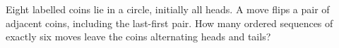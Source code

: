 Eight labelled coins lie in a circle, initially all heads. A move flips a pair of adjacent coins, including the last-first pair. How many ordered sequences of exactly six moves leave the coins alternating heads and tails?
